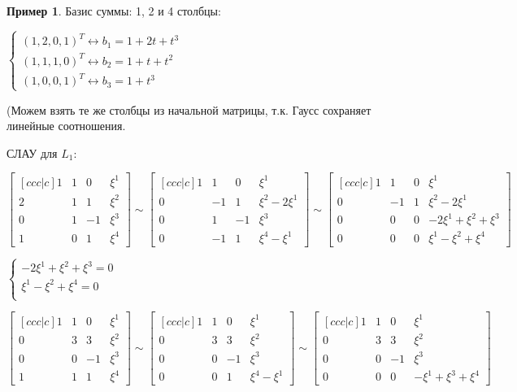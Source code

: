 \documentclass{book}
\theoremstyle{definition}
\newtheorem*{example}{Пример}
\begin{document}
\begin{example}
        Базис суммы: 1, 2 и 4 столбцы:

        $\begin{cases}
            \left( 1, 2, 0, 1 \right) ^T\leftrightarrow b_1 = 1+2t+t^3\\
            \left( 1, 1, 1, 0 \right) ^T\leftrightarrow b_2 = 1+t+t^2\\
            \left( 1,0,0,1 \right) ^T \leftrightarrow b_3 = 1+t^3
        \end{cases}$ 

        (Можем взять те же столбцы из начальной матрицы, т.к. Гаусс сохраняет линейные соотношения.

        СЛАУ для $L_1$:

        $\begin{bmatrix} [c c c|c] 1&1&0&\xi^1\\2&1&1&\xi^2\\0&1&-1&\xi^3\\1&0&1&\xi^4  \end{bmatrix} \sim \begin{bmatrix} [c c c| c]1&1&0&\xi^1\\0&-1&1&\xi^2-2\xi^1\\0&1&-1&\xi^3\\0&-1&1&\xi^4-\xi^1 \end{bmatrix} \sim \begin{bmatrix} [c c c| c] 1&1&0&\xi^1\\0&-1&1&\xi^2-2\xi^1\\0&0&0&-2\xi^1+\xi^2+\xi^3\\0&0&0&\xi^1-\xi^2+\xi^4 \end{bmatrix} $

        $\begin{cases}
            -2\xi^1+\xi^2+\xi^3=0\\
            \xi^1-\xi^2+\xi^4= 0\\
        \end{cases}$ 

        $\begin{bmatrix} [c c c|c] 1&1&0&\xi^1\\0&3&3&\xi^2\\0&0&-1&\xi^3\\1&1&1&\xi^4 \end{bmatrix} \sim \begin{bmatrix} [c c c|c] 1&1&0&\xi^1\\0&3&3&\xi^2\\0&0&-1&\xi^3\\0&0&1&\xi^4-\xi^1 \end{bmatrix} \sim \begin{bmatrix} [c c c|c] 1&1&0&\xi^1\\0&3&3&\xi^2\\0&0&-1&\xi^3\\0&0&0&-\xi^1+\xi^3+\xi^4 \end{bmatrix}$


\end{example}
\end{document}
